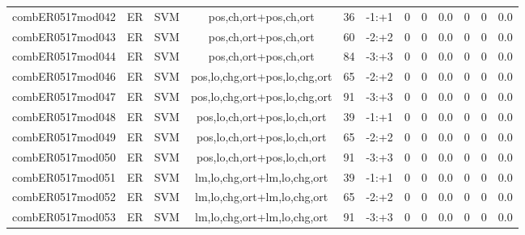 \documentclass[a4paper]{article}
\begin{document}
\begin{landscape}
\begin{center}
\begin{tabular}{ |c|c|c|c|c|c|c|c|c|c|c|c|}
 
 	
 	\small{ combER0517mod042 } & ER & SVM & pos,ch,ort+pos,ch,ort  &  36 &  -1:+1  &  0 & 0 & 0.0  &  0 & 0 & 0.0 \\
 	

 
 	
 	\small{ combER0517mod043 } & ER & SVM & pos,ch,ort+pos,ch,ort  &  60 &  -2:+2  &  0 & 0 & 0.0  &  0 & 0 & 0.0 \\
 	

 
 	
 	\small{ combER0517mod044 } & ER & SVM & pos,ch,ort+pos,ch,ort  &  84 &  -3:+3  &  0 & 0 & 0.0  &  0 & 0 & 0.0 \\
 	

 
 	
 	\small{ combER0517mod046 } & ER & SVM & pos,lo,chg,ort+pos,lo,chg,ort  &  65 &  -2:+2  &  0 & 0 & 0.0  &  0 & 0 & 0.0 \\
 	

 
 	
 	\small{ combER0517mod047 } & ER & SVM & pos,lo,chg,ort+pos,lo,chg,ort  &  91 &  -3:+3  &  0 & 0 & 0.0  &  0 & 0 & 0.0 \\
 	

 
 	
 	\small{ combER0517mod048 } & ER & SVM & pos,lo,ch,ort+pos,lo,ch,ort  &  39 &  -1:+1  &  0 & 0 & 0.0  &  0 & 0 & 0.0 \\
 	

 
 	
 	\small{ combER0517mod049 } & ER & SVM & pos,lo,ch,ort+pos,lo,ch,ort  &  65 &  -2:+2  &  0 & 0 & 0.0  &  0 & 0 & 0.0 \\
 	

 
 	
 	\small{ combER0517mod050 } & ER & SVM & pos,lo,ch,ort+pos,lo,ch,ort  &  91 &  -3:+3  &  0 & 0 & 0.0  &  0 & 0 & 0.0 \\
 	

 
 	
 	\small{ combER0517mod051 } & ER & SVM & lm,lo,chg,ort+lm,lo,chg,ort  &  39 &  -1:+1  &  0 & 0 & 0.0  &  0 & 0 & 0.0 \\
 	

 
 	
 	\small{ combER0517mod052 } & ER & SVM & lm,lo,chg,ort+lm,lo,chg,ort  &  65 &  -2:+2  &  0 & 0 & 0.0  &  0 & 0 & 0.0 \\
 	

 
 	
 	\small{ combER0517mod053 } & ER & SVM & lm,lo,chg,ort+lm,lo,chg,ort  &  91 &  -3:+3  &  0 & 0 & 0.0  &  0 & 0 & 0.0 \\
 	


\end{tabular}
\end{center}
\end{landscape}
\end{document}
